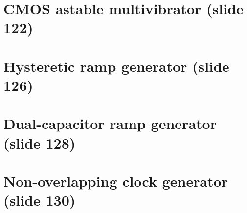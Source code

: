 \section{CMOS astable multivibrator (slide 122)}

\section{Hysteretic ramp generator (slide 126)}

\section{Dual-capacitor ramp generator (slide 128)}

\section{Non-overlapping clock generator (slide 130)}